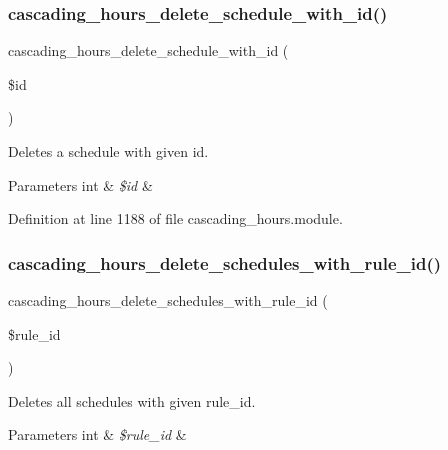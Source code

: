 \subsubsection{\texorpdfstring{cascading\+\_\+hours\+\_\+delete\+\_\+schedule\+\_\+with\+\_\+id()}{cascading\_hours\_delete\_schedule\_with\_id()}}
{\footnotesize\ttfamily cascading\+\_\+hours\+\_\+delete\+\_\+schedule\+\_\+with\+\_\+id (\begin{DoxyParamCaption}\item[{}]{\$id }\end{DoxyParamCaption})}



Deletes a schedule with given id. 


\begin{DoxyParams}[1]{Parameters}
int & {\em \$id} & \\
\hline
\end{DoxyParams}


Definition at line 1188 of file cascading\+\_\+hours.\+module.

\mbox{\label{cascading__hours_8module_ae32cff1d7b513e0d0ca72aac20938052_ae32cff1d7b513e0d0ca72aac20938052}} 
\subsubsection{\texorpdfstring{cascading\+\_\+hours\+\_\+delete\+\_\+schedules\+\_\+with\+\_\+rule\+\_\+id()}{cascading\_hours\_delete\_schedules\_with\_rule\_id()}}
{\footnotesize\ttfamily cascading\+\_\+hours\+\_\+delete\+\_\+schedules\+\_\+with\+\_\+rule\+\_\+id (\begin{DoxyParamCaption}\item[{}]{\$rule\+\_\+id }\end{DoxyParamCaption})}



Deletes all schedules with given rule\+\_\+id. 


\begin{DoxyParams}[1]{Parameters}
int & {\em \$rule\+\_\+id} & \\
\hline
\end{DoxyParams}


